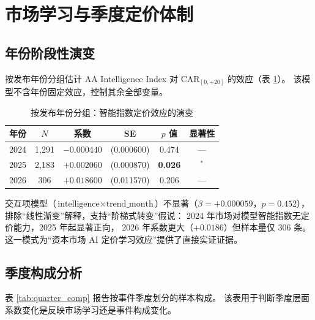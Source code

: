 \documentclass[11pt,fontset=fandol,a4paper]{ctexart}
\begin{document}
\section{市场学习与季度定价体制}

\subsection{年份阶段性演变}

按发布年份分组估计 AA Intelligence Index 对 $\text{CAR}_{[0,+20]}$ 的效应（表 \ref{tab:year_split}）。
该模型不含年份固定效应，控制其余全部变量。

\begin{table}[htbp]
\centering
\caption{按发布年份分组：智能指数定价效应的演变}
\label{tab:year_split}
\small
\begin{tabular}{lccccc}
\toprule
年份 & $N$ & 系数 & SE & $p$ 值 & 显著性 \\
\midrule
2024 & 1{,}291 & $-0.000440$ & (0.000600)  & 0.474 & --- \\
2025 & 2{,}183 & \textbf{$+0.002060$} & (0.000870)  & \textbf{0.026} & $^{*}$ \\
2026 &   306 & $+0.018600$ & (0.011570) & 0.206 & --- \\
\bottomrule
\end{tabular}
\end{table}

交互项模型（$\text{intelligence}\times\text{trend\_month}$）不显著（$\beta=+0.000059$，$p=0.452$），
排除``线性渐变''解释，支持``阶梯式转变''假说：
2024 年市场对模型智能指数无定价能力，2025 年起显著正向，
2026 年系数更大（$+0.0186$）但样本量仅 306 条。
这一模式为``资本市场 AI 定价学习效应''提供了直接实证证据。

\subsection{季度构成分析}

表 \ref{tab:quarter_comp} 报告按事件季度划分的样本构成。
该表用于判断季度层面系数变化是反映市场学习还是事件构成变化。
\end{document}
